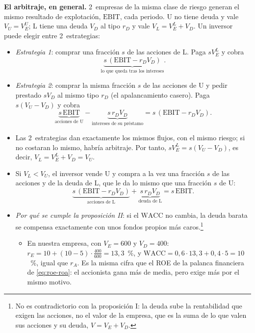 \documentclass[11pt]{article}
\begin{document}
\begin{anotaciones}
\textbf{El arbitraje, en general.} 2~empresas de la misma clase de riesgo generan el mismo resultado de explotación, $\mathrm{EBIT}$, cada periodo. U no tiene deuda y vale $V_U=V_E^U$; L tiene una deuda $V_D$ al tipo $r_D$ y vale $V_L=V_E^L+V_D$. Un inversor puede elegir entre 2~estrategias\nocite{Vernimmen2017Corporate}:
\begin{itemize}
\item \emph{Estrategia 1}: comprar una fracción $s$ de las acciones de L. Paga $s V_E^L$ y cobra
  \[
  \underbrace{s\,(\mathrm{EBIT}-r_DV_D)}_{\text{lo que queda tras los intereses}}.
  \]
\item \emph{Estrategia 2}: comprar la misma fracción $s$ de las acciones de U y pedir prestado $s V_D$ al mismo tipo $r_D$ (el apalancamiento casero). Paga $s(V_U-V_D)$ y cobra
  \[
  \underbrace{s\,\mathrm{EBIT}}_{\text{acciones de U}}-\underbrace{s\,r_DV_D}_{\text{intereses de su préstamo}}=s\,(\mathrm{EBIT}-r_DV_D).
  \]
\item Las 2~estrategias dan exactamente los mismos flujos, con el mismo riesgo; si no costaran lo mismo, habría arbitraje. Por tanto, $s V_E^L=s(V_U-V_D)$, es decir, $V_L=V_E^L+V_D=V_U$.
\item Si $V_L<V_U$, el inversor vende U y compra a la vez una fracción $s$ de las acciones y de la deuda de L, que le da lo mismo que una fracción $s$ de U:
  \[
  \underbrace{s\,(\mathrm{EBIT}-r_DV_D)}_{\text{acciones de L}}+\underbrace{s\,r_DV_D}_{\text{deuda de L}}=s\,\mathrm{EBIT}.
  \]
  \findemo
\end{itemize}
\end{anotaciones}

\begin{itemize}
\item \emph{Por qué se cumple la proposición II}: si el $\mathrm{WACC}$ no cambia, la deuda barata se compensa exactamente con unos fondos propios más caros.\footnote{No es contradictorio con la proposición I: la deuda sube la rentabilidad que exigen las acciones, no el valor de la empresa, que es la suma de lo que valen sus acciones y su deuda, $V=V_E+V_D$.}
  \begin{itemize}
  \item En nuestra empresa, con $V_E=600$ y $V_D=400$: $r_E=10+(10-5)\cdot\tfrac{400}{600}=13{,}3$~\%, y $\mathrm{WACC}=0{,}6\cdot13{,}3+0{,}4\cdot5=10$~\%, igual que $r_A$. Es la misma cifra que el ROE de la palanca financiera de \eqref{eq:roe-roa}: el accionista gana más de media, pero exige más por el mismo motivo.
  \end{itemize}
\end{itemize}
\end{document}
